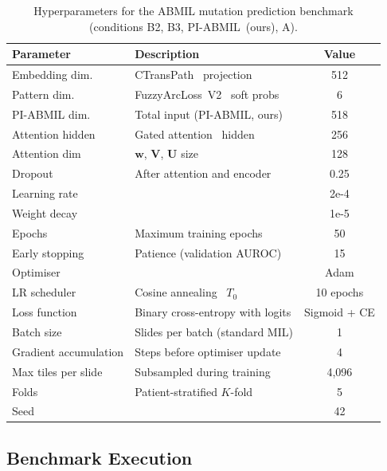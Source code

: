 \begin{table}[ht!]
\centering
\small
\caption{Hyperparameters for the ABMIL mutation prediction benchmark
(conditions B2, B3, PI-ABMIL~(ours), A).}
\label{tab:hyper_abmil2}
\begin{tabular}{l l c}
\hline
\textbf{Parameter} & \textbf{Description} & \textbf{Value} \\
\hline
Embedding dim.      & CTransPath~\cite{wang2022ctranspath} projection & 512 \\
Pattern dim.        & FuzzyArcLoss~V2~\cite{lima2025fuzzy} soft probs & 6 \\
PI-ABMIL dim.       & Total input (PI-ABMIL, ours)        & 518 \\
Attention hidden    & Gated attention~\cite{ilse2018attention} hidden & 256 \\
Attention dim       & $\mathbf{w}$, $\mathbf{V}$, $\mathbf{U}$ size & 128 \\
Dropout~\cite{srivastava2014dropout} & After attention and encoder & 0.25 \\
Learning rate       &                                     & 2e-4 \\
Weight decay        &                                     & 1e-5 \\
Epochs              & Maximum training epochs             & 50 \\
Early stopping      & Patience (validation AUROC)         & 15 \\
Optimiser           &                                     & Adam \\
LR scheduler        & Cosine annealing~\cite{loshchilov2017sgdr} $T_0$ & 10 epochs \\
Loss function       & Binary cross-entropy with logits    & Sigmoid + CE \\
Batch size          & Slides per batch (standard MIL)     & 1 \\
Gradient accumulation & Steps before optimiser update     & 4 \\
Max tiles per slide & Subsampled during training          & 4{,}096 \\
Folds               & Patient-stratified $K$-fold         & 5 \\
Seed                &                                     & 42 \\
\hline
\end{tabular}
\end{table}


\subsection{Benchmark Execution}
\label{sec:impl:mutation:benchmark}

